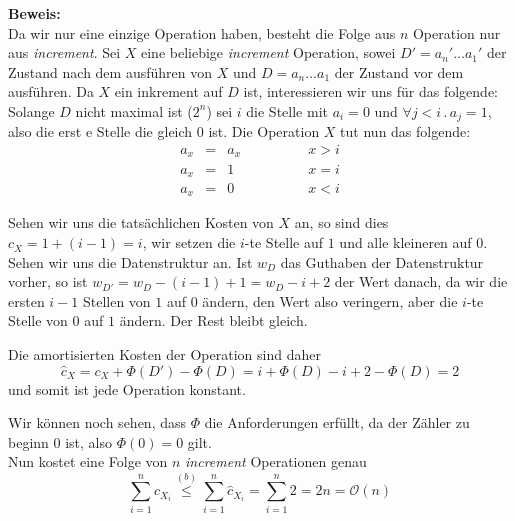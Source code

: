 \documentclass[11pt,a4paper,ngerman]{article}
\begin{document}
\noindent\textbf{Beweis:}\\
Da wir nur eine einzige Operation haben, besteht die Folge aus $n$ Operation nur aus \emph{increment}. Sei $X$ eine beliebige \emph{increment} Operation, sowei $D'=a_n'\dots a_1'$ der Zustand nach dem ausführen von $X$ und $D=a_n\dots a_1$ der Zustand vor dem ausführen. Da $X$ ein inkrement auf $D$ ist, interessieren wir uns für das folgende: Solange $D$ nicht maximal ist ($2^n$) sei $i$ die Stelle mit $a_i = 0$ und $\forall j < i \, . \, a_j = 1$, also die erst e Stelle die gleich $0$ ist. Die Operation $X$ tut nun das folgende:
$$\begin{array}{rclr}
	a_x &=& a_x\qquad \qquad &  x > i\\
	a_x &=& 1 & x = i\\
	a_x &=& 0 & x < i
\end{array}$$

Sehen wir uns die tatsächlichen Kosten von $X$ an, so sind dies $c_X = 1 + (i-1) = i$, wir setzen die $i$-te Stelle auf $1$ und alle kleineren auf $0$.
Sehen wir uns die Datenstruktur an. Ist $w_D$ das Guthaben der Datenstruktur vorher, so ist $w_{D'} = w_D - (i-1) + 1 = w_D - i +2$ der Wert danach, da wir die ersten $i-1$ Stellen von $1$ auf $0$ ändern, den Wert also veringern, aber die $i$-te Stelle von $0$ auf $1$ ändern. Der Rest bleibt gleich.

Die amortisierten Kosten der Operation sind daher
$$
	\hat{c}_X = c_X + \Phi(D') - \Phi(D) = i + \Phi(D) -  i  + 2 - \Phi(D) = 2
$$
und somit ist jede Operation konstant.

Wir können noch sehen, dass $\Phi$ die Anforderungen erfüllt, da der Zähler zu beginn $0$ ist, also $\Phi(0) = 0$ gilt.\\

Nun kostet eine Folge von $n$ \emph{increment} Operationen genau
$$
	\sum_{i=1}^n c_{X_i} \stackrel{(b)}{\leq} \sum_{i=1}^n \hat{c}_{X_i} = \sum_{i=1}^n 2 = 2n = \mathcal{O}(n)
$$

\label{LastPage}
\end{document}
